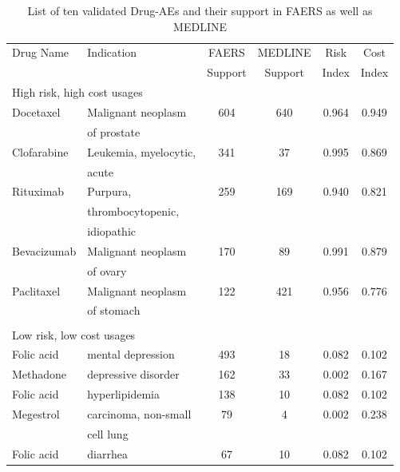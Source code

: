 \begin{table}
\begin{center}
\begin{tabular}{|l|l|c|c|c|c||}
  \hline Drug Name & Indication & FAERS & MEDLINE & Risk & Cost \\ & &
  Support & Support & Index & Index \\ \hline\hline
  \multicolumn{6}{|l|}{High risk, high cost usages} \\ \hline
  Docetaxel & Malignant neoplasm & 604 & 640 & 0.964 & 0.949\\ & of
  prostate & & & & \\ \hline Clofarabine & Leukemia, myelocytic,& 341
  & 37 & 0.995 & 0.869 \\ & acute & & & & \\ \hline Rituximab &
  Purpura, & 259 & 169 & 0.940 & 0.821 \\ & thrombocytopenic, & & & &
  \\ & idiopathic & & & & \\ \hline Bevacizumab & Malignant neoplasm &
  170 & 89 & 0.991 & 0.879 \\ & of ovary & & & & \\ \hline Paclitaxel
  & Malignant neoplasm & 122 & 421 & 0.956 & 0.776 \\ & of stomach & &
  & & \\ \\ \hline \multicolumn{6}{|l|}{Low risk, low cost usages}
  \\ \hline Folic acid & mental depression & 493 & 18 & 0.082 & 0.102
  \\ \hline Methadone & depressive disorder & 162 & 33 & 0.002 & 0.167
  \\ \hline Folic acid & hyperlipidemia & 138 & 10 & 0.082 & 0.102
  \\ \hline Megestrol & carcinoma, non-small & 79 & 4 & 0.002 & 0.238
  \\ & cell lung & & & & \\ \hline Folic acid & diarrhea & 67 & 10 &
  0.082 & 0.102 \\ \hline
\end{tabular}
\end{center}
\caption[Ten validated Drug-AEs]{List of ten validated Drug-AEs and
  their support in FAERS as well as MEDLINE}
\end{table}


